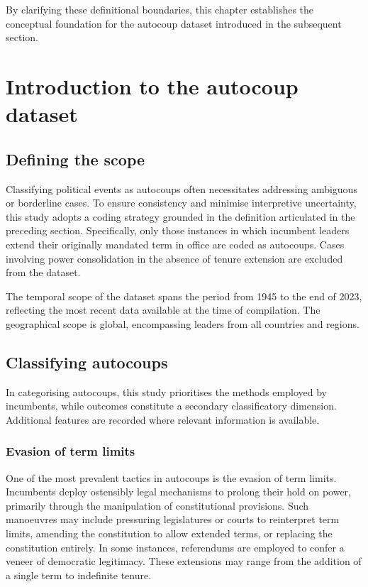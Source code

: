\documentclass[
  12pt,
]{report}
\begin{document}
By clarifying these definitional boundaries, this chapter establishes
the conceptual foundation for the autocoup dataset introduced in the
subsequent section.

\section{Introduction to the autocoup
dataset}\label{introduction-to-the-autocoup-dataset}

\subsection*{Defining the scope}\label{defining-the-scope}

Classifying political events as autocoups often necessitates addressing
ambiguous or borderline cases. To ensure consistency and minimise
interpretive uncertainty, this study adopts a coding strategy grounded
in the definition articulated in the preceding section. Specifically,
only those instances in which incumbent leaders extend their originally
mandated term in office are coded as autocoups. Cases involving power
consolidation in the absence of tenure extension are excluded from the
dataset.

The temporal scope of the dataset spans the period from 1945 to the end
of 2023, reflecting the most recent data available at the time of
compilation. The geographical scope is global, encompassing leaders from
all countries and regions.

\subsection*{Classifying autocoups}\label{classifying-autocoups}

In categorising autocoups, this study prioritises the methods employed
by incumbents, while outcomes constitute a secondary classificatory
dimension. Additional features are recorded where relevant information
is available.

\subsubsection*{Evasion of term limits}\label{evasion-of-term-limits}

One of the most prevalent tactics in autocoups is the evasion of term
limits. Incumbents deploy ostensibly legal mechanisms to prolong their
hold on power, primarily through the manipulation of constitutional
provisions. Such manoeuvres may include pressuring legislatures or
courts to reinterpret term limits, amending the constitution to allow
extended terms, or replacing the constitution entirely. In some
instances, referendums are employed to confer a veneer of democratic
legitimacy. These extensions may range from the addition of a single
term to indefinite tenure.
\end{document}
